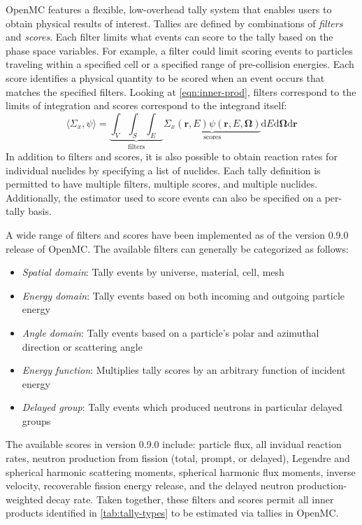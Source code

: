 OpenMC features a flexible, low-overhead tally system that enables users to obtain physical results of interest. Tallies are defined by combinations of \emph{filters} and \emph{scores}. Each filter limits what events can score to the tally based on the phase space variables. For example, a filter could limit scoring events to particles traveling within a specified cell or a specified range of pre-collision energies. Each score identifies a physical quantity to be scored when an event occurs that matches the specified filters. Looking at \cref{eqn:inner-prod}, filters correspond to the limits of integration and scores correspond to the integrand itself:
\begin{equation}
\langle \Sigma_x, \psi \rangle = \underbrace{\int_{V} \int_{S} \int_{E}}_{\text{filters}} \underbrace{\Sigma_{x}(\mathbf{r},E)\psi(\mathbf{r},E,\mathbf{\Omega})}_{\text{scores}} \mathrm{d}E\mathrm{d}\mathbf{\Omega}\mathrm{d}\mathbf{r}
\end{equation}
In addition to filters and scores, it is also possible to obtain reaction rates for individual nuclides by specifying a list of nuclides. Each tally definition is permitted to have multiple filters, multiple scores, and multiple nuclides. Additionally, the estimator used to score events can also be specified on a per-tally basis.

A wide range of filters and scores have been implemented as of the version 0.9.0 release of OpenMC\cite{openmc-090}. The available filters can generally be categorized as follows:
\begin{itemize}[noitemsep]
\item \emph{Spatial domain}: Tally events by universe, material, cell, mesh
\item \emph{Energy domain}: Tally events based on both incoming and outgoing particle energy
\item \emph{Angle domain}: Tally events based on a particle's polar and azimuthal direction or scattering angle
\item \emph{Energy function}: Multiplies tally scores by an arbitrary function of incident energy
\item \emph{Delayed group}: Tally events which produced neutrons in particular delayed groups
\end{itemize}
The available scores in version 0.9.0 include: particle flux, all invidual reaction rates, neutron production from fission (total, prompt, or delayed), Legendre and spherical harmonic scattering moments, spherical harmonic flux moments, inverse velocity, recoverable fission energy release, and the delayed neutron production-weighted decay rate. Taken together, these filters and scores permit all inner products identified in \cref{tab:tally-types} to be estimated via tallies in OpenMC.

